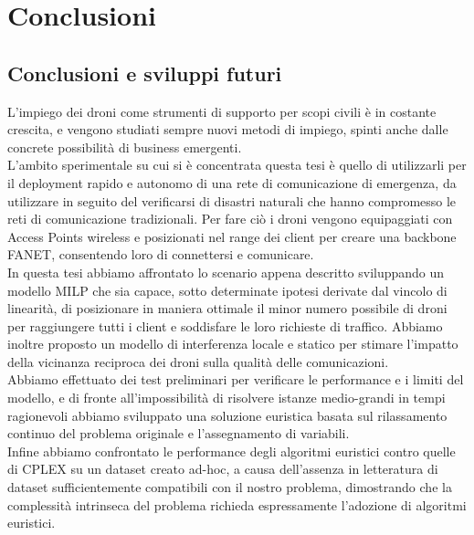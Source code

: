  \chapter{Conclusioni} \label{chap:conclusioni}

\ifpdf
    \graphicspath{{Chapter8/Figs/Raster/}{Chapter8/Figs/PDF/}{Chapter8/Figs/}}
\else
    \graphicspath{{Chapter8/Figs/Vector/}{Chapter8/Figs/}}
\fi

\section{Conclusioni e sviluppi futuri}
L'impiego dei droni come strumenti di supporto per scopi civili è in costante crescita, e vengono studiati sempre nuovi metodi di impiego, spinti anche dalle concrete possibilità di business emergenti. \\
L'ambito sperimentale su cui si è concentrata questa tesi è quello di utilizzarli per il deployment rapido e autonomo di una rete di comunicazione di emergenza, da utilizzare in seguito del verificarsi di disastri naturali che hanno compromesso le reti di comunicazione tradizionali.
Per fare ciò i droni vengono equipaggiati con Access Points wireless e posizionati nel range dei client per creare una backbone FANET, consentendo loro di connettersi e comunicare. \\
In questa tesi abbiamo affrontato lo scenario appena descritto sviluppando un modello MILP che sia capace, sotto determinate ipotesi derivate dal vincolo di linearità, di posizionare in maniera ottimale il minor numero possibile di droni per raggiungere tutti i client e soddisfare le loro richieste di traffico. Abbiamo inoltre proposto un modello di interferenza locale e statico per stimare l'impatto della vicinanza reciproca dei droni sulla qualità delle comunicazioni. \\
Abbiamo effettuato dei test preliminari per verificare le performance e i limiti del modello, e di fronte all'impossibilità di risolvere istanze medio-grandi in tempi ragionevoli abbiamo sviluppato una soluzione euristica basata sul rilassamento continuo del problema originale e l'assegnamento di variabili. \\
Infine abbiamo confrontato le performance degli algoritmi euristici contro quelle di CPLEX su un dataset creato ad-hoc, a causa dell'assenza in letteratura di dataset sufficientemente compatibili con il nostro problema, dimostrando che la complessità intrinseca del problema richieda espressamente l'adozione di algoritmi euristici. \\

